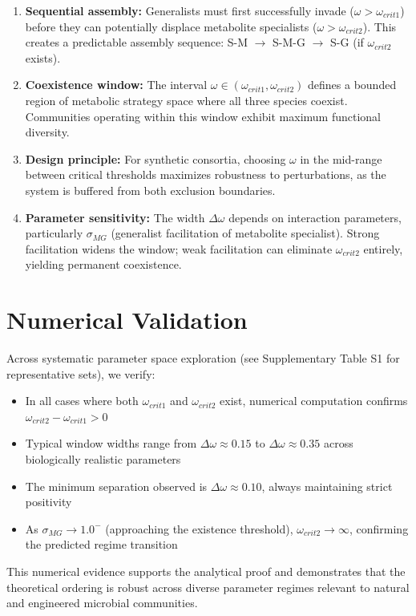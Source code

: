 \documentclass[11pt]{article}
\begin{document}
\begin{enumerate}
    \item \textbf{Sequential assembly:} Generalists must first successfully invade ($\omega > \omega_{crit1}$) before they can potentially displace metabolite specialists ($\omega > \omega_{crit2}$). This creates a predictable assembly sequence: S-M $\to$ S-M-G $\to$ S-G (if $\omega_{crit2}$ exists).

    \item \textbf{Coexistence window:} The interval $\omega \in (\omega_{crit1}, \omega_{crit2})$ defines a bounded region of metabolic strategy space where all three species coexist. Communities operating within this window exhibit maximum functional diversity.

    \item \textbf{Design principle:} For synthetic consortia, choosing $\omega$ in the mid-range between critical thresholds maximizes robustness to perturbations, as the system is buffered from both exclusion boundaries.

    \item \textbf{Parameter sensitivity:} The width $\Delta\omega$ depends on interaction parameters, particularly $\sigma_{MG}$ (generalist facilitation of metabolite specialist). Strong facilitation widens the window; weak facilitation can eliminate $\omega_{crit2}$ entirely, yielding permanent coexistence.
\end{enumerate}

\section*{Numerical Validation}

Across systematic parameter space exploration (see Supplementary Table S1 for representative sets), we verify:

\begin{itemize}
    \item In all cases where both $\omega_{crit1}$ and $\omega_{crit2}$ exist, numerical computation confirms $\omega_{crit2} - \omega_{crit1} > 0$
    \item Typical window widths range from $\Delta\omega \approx 0.15$ to $\Delta\omega \approx 0.35$ across biologically realistic parameters
    \item The minimum separation observed is $\Delta\omega \approx 0.10$, always maintaining strict positivity
    \item As $\sigma_{MG} \to 1.0^-$ (approaching the existence threshold), $\omega_{crit2} \to \infty$, confirming the predicted regime transition
\end{itemize}

This numerical evidence supports the analytical proof and demonstrates that the theoretical ordering is robust across diverse parameter regimes relevant to natural and engineered microbial communities.
\end{document}
